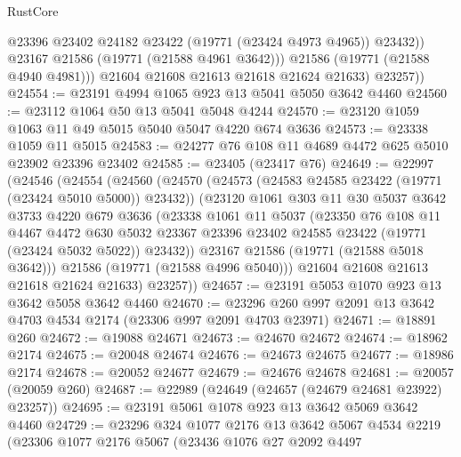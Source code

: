 \begin{lexlean}{RustCore}
\begin{coremodule}
                  @23396
                  @23402
                  @24182
                  @23422
                  (@19771 (@23424 @4973 @4965))
                  @23432))
              @23167
              @21586
              (@19771 (@21588 @4961 @3642)))
            @21586
            (@19771 (@21588 @4940 @4981)))
          @21604
          @21608
          @21613
          @21618
          @21624
          @21633)
        @23257))
@24554 := @23191 @4994 @1065 @923 @13 @5041 @5050 @3642 @4460
@24560 := @23112 @1064 @50 @13 @5041 @5048 @4244
@24570 := @23120 @1059 @1063 @11 @49 @5015 @5040 @5047 @4220 @674 @3636
@24573 := @23338 @1059 @11 @5015
@24583 := @24277 @76 @108 @11 @4689 @4472 @625 @5010 @23902 @23396 @23402
@24585 := @23405 (@23417 @76)
@24649 := @22997
    (@24546
      (@24554
        (@24560
          (@24570
            (@24573 (@24583 @24585 @23422 (@19771 (@23424 @5010 @5000)) @23432))
            (@23120
              @1061
              @303
              @11
              @30
              @5037
              @3642
              @3733
              @4220
              @679
              @3636
              (@23338
                @1061
                @11
                @5037
                (@23350
                  @76
                  @108
                  @11
                  @4467
                  @4472
                  @630
                  @5032
                  @23367
                  @23396
                  @23402
                  @24585
                  @23422
                  (@19771 (@23424 @5032 @5022))
                  @23432))
              @23167
              @21586
              (@19771 (@21588 @5018 @3642)))
            @21586
            (@19771 (@21588 @4996 @5040)))
          @21604
          @21608
          @21613
          @21618
          @21624
          @21633)
        @23257))
@24657 := @23191 @5053 @1070 @923 @13 @3642 @5058 @3642 @4460
@24670 := @23296 @260 @997 @2091 @13 @3642 @4703 @4534 @2174 (@23306 @997 @2091 @4703 @23971)
@24671 := @18891 @260
@24672 := @19088 @24671
@24673 := @24670 @24672
@24674 := @18962 @2174
@24675 := @20048 @24674
@24676 := @24673 @24675
@24677 := @18986 @2174
@24678 := @20052 @24677
@24679 := @24676 @24678
@24681 := @20057 (@20059 @260)
@24687 := @22989 (@24649 (@24657 (@24679 @24681 @23922) @23257))
@24695 := @23191 @5061 @1078 @923 @13 @3642 @5069 @3642 @4460
@24729 := @23296
    @324
    @1077
    @2176
    @13
    @3642
    @5067
    @4534
    @2219
    (@23306
      @1077
      @2176
      @5067
      (@23436
        @1076
        @27
        @2092
        @4497

\end{coremodule}
\end{lexlean}
